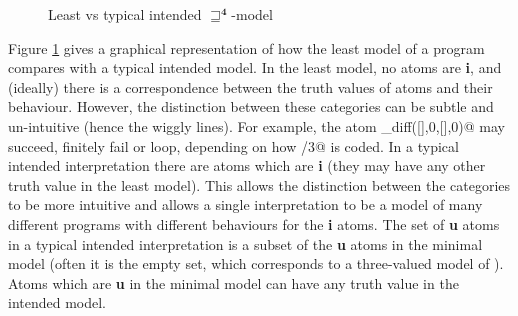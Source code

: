 \documentclass{tlp}
\newcommand{\Quad}{\ensuremath{\mathbf{4}}}
\begin{document}
\begin{figure}[t]
\caption{Least vs typical intended $\sqsupseteq^\Quad$-model\label{fig-venn}}
\end{figure}




Figure \ref{fig-venn} gives a graphical representation of how the
least model of a program compares with a typical intended model.  In the least
model, no atoms are \textbf{i}, and (ideally) there is a correspondence between
the truth values of atoms and their behaviour.
However, the distinction between these categories can be subtle and
un-intuitive (hence the wiggly lines).
For example, the atom \verb@eq_diff([],0,[],0)@ may succeed, 
finitely fail or loop, depending on how \verb@sub/3@ is coded.
In a typical intended interpretation
there are atoms which are \textbf{i} (they may have any other truth value
in the least model).  This allows the distinction between the categories
to be more intuitive and allows a single interpretation to be a model
of many different programs with different behaviours for the \textbf{i}
atoms.  The set of \textbf{u} atoms in a typical intended interpretation
is a subset of the \textbf{u} atoms in the minimal model (often it is
the empty set, which corresponds to a three-valued model of
).  Atoms which
are \textbf{u} in the minimal model can have any truth value in the
intended model.
\end{document}
